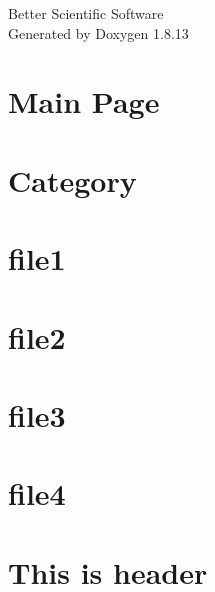 \documentclass[twoside]{book}
\newcommand{\+}{\discretionary{\mbox{\scriptsize$\hookleftarrow$}}{}{}}
\newcommand{\clearemptydoublepage}{%
  \newpage{\pagestyle{empty}\cleardoublepage}%
}
\begin{document}
\hypersetup{pageanchor=false,
             bookmarksnumbered=true,
             pdfencoding=unicode
            }
\begin{titlepage}
\vspace*{7cm}
\begin{center}%
{\Large Better Scientific Software }\\
\vspace*{1cm}
{\large Generated by Doxygen 1.8.13}\\
\end{center}
\end{titlepage}
\clearemptydoublepage
{}
\tableofcontents
\clearemptydoublepage
{}
\hypersetup{pageanchor=true}

\chapter{Main Page}
\label{index}\hypertarget{index}{}
\chapter{Category}
\label{md_markdown_category}

\chapter{file1}
\label{md_markdown_file1}

\chapter{file2}
\label{md_markdown_file2}

\chapter{file3}
\label{md_markdown_file3}

\chapter{file4}
\label{md_markdown_file4}

\chapter{This is header}
\label{md_markdown_intro1}

\end{document}
